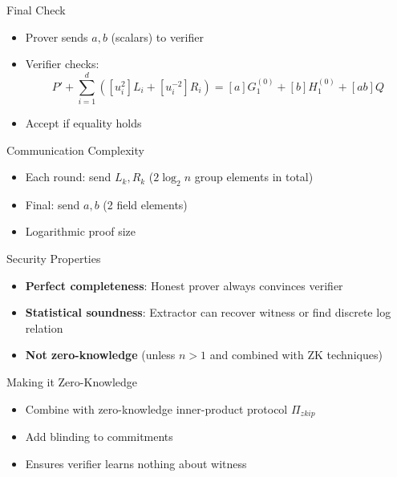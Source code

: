 \documentclass{zkdl-presentation-template}
\begin{document}
\begin{frame}{Final Check}
    \begin{itemize}
        \item Prover sends $a, b$ (scalars) to verifier
        \item Verifier checks:
        \begin{equation*}
            P' + \sum_{i=1}^d ([u_i^2]L_i + [u_i^{-2}]R_i) = [a]G_1^{(0)} + [b]H_1^{(0)} + [ab]Q
        \end{equation*}
        \item Accept if equality holds
    \end{itemize}
\end{frame}

\begin{frame}{Communication Complexity}
    \begin{itemize}
        \item Each round: send $L_k, R_k$ ($2 \log_2 n$ group elements in total)
        \item Final: send $a, b$ (2 field elements)
        \item Logarithmic proof size
    \end{itemize}
\end{frame}

\begin{frame}{Security Properties}
    \begin{itemize}
        \item \textbf{Perfect completeness}: Honest prover always convinces verifier
        \item \textbf{Statistical soundness}: Extractor can recover witness or find discrete log relation
        \item \textbf{Not zero-knowledge} (unless $n>1$ and combined with ZK techniques)
    \end{itemize}
\end{frame}

\begin{frame}{Making it Zero-Knowledge}
    \begin{itemize}
        \item Combine with zero-knowledge inner-product protocol $\Pi_{zkip}$
        \item Add blinding to commitments
        \item Ensures verifier learns nothing about witness
    \end{itemize}
\end{frame}
\end{document}
